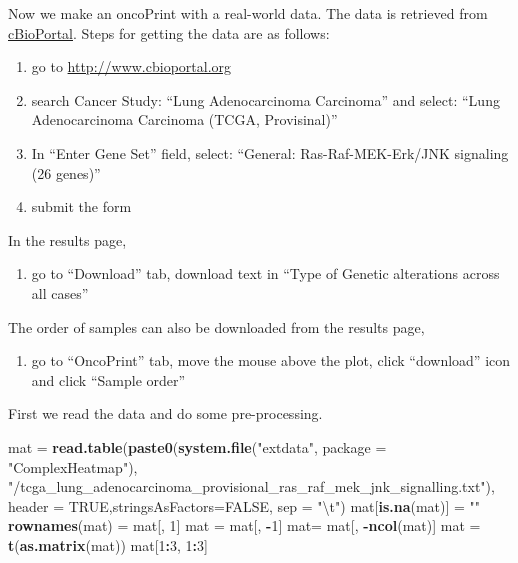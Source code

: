 \documentclass[]{book}
\newenvironment{Shaded}{\begin{snugshade}}{\end{snugshade}}
\newcommand{\KeywordTok}[1]{\textcolor[rgb]{0.13,0.29,0.53}{\textbf{#1}}}
\newcommand{\DataTypeTok}[1]{\textcolor[rgb]{0.13,0.29,0.53}{#1}}
\newcommand{\DecValTok}[1]{\textcolor[rgb]{0.00,0.00,0.81}{#1}}
\newcommand{\CharTok}[1]{\textcolor[rgb]{0.31,0.60,0.02}{#1}}
\newcommand{\StringTok}[1]{\textcolor[rgb]{0.31,0.60,0.02}{#1}}
\newcommand{\OtherTok}[1]{\textcolor[rgb]{0.56,0.35,0.01}{#1}}
\newcommand{\OperatorTok}[1]{\textcolor[rgb]{0.81,0.36,0.00}{\textbf{#1}}}
\newcommand{\NormalTok}[1]{#1}
\providecommand{\tightlist}{%
  \setlength{\itemsep}{0pt}\setlength{\parskip}{0pt}}
\theoremstyle{definition}
\theoremstyle{definition}
\theoremstyle{definition}
\theoremstyle{remark}
\begin{document}
Now we make an oncoPrint with a real-world data. The data is retrieved
from \href{http://www.cbioportal.org/}{cBioPortal}. Steps for getting
the data are as follows:

\begin{enumerate}
\def\labelenumi{\arabic{enumi}.}
\tightlist
\item
  go to \url{http://www.cbioportal.org}
\item
  search Cancer Study: ``Lung Adenocarcinoma Carcinoma'' and select:
  ``Lung Adenocarcinoma Carcinoma (TCGA, Provisinal)''
\item
  In ``Enter Gene Set'' field, select: ``General: Ras-Raf-MEK-Erk/JNK
  signaling (26 genes)''
\item
  submit the form
\end{enumerate}

In the results page,

\begin{enumerate}
\def\labelenumi{\arabic{enumi}.}
\setcounter{enumi}{4}
\tightlist
\item
  go to ``Download'' tab, download text in ``Type of Genetic alterations
  across all cases''
\end{enumerate}

The order of samples can also be downloaded from the results page,

\begin{enumerate}
\def\labelenumi{\arabic{enumi}.}
\setcounter{enumi}{5}
\tightlist
\item
  go to ``OncoPrint'' tab, move the mouse above the plot, click
  ``download'' icon and click ``Sample order''
\end{enumerate}

First we read the data and do some pre-processing.

\begin{Shaded}
\begin{Highlighting}[]
\NormalTok{mat =}\StringTok{ }\KeywordTok{read.table}\NormalTok{(}\KeywordTok{paste0}\NormalTok{(}\KeywordTok{system.file}\NormalTok{(}\StringTok{"extdata"}\NormalTok{, }\DataTypeTok{package =} \StringTok{"ComplexHeatmap"}\NormalTok{), }
    \StringTok{"/tcga_lung_adenocarcinoma_provisional_ras_raf_mek_jnk_signalling.txt"}\NormalTok{), }
    \DataTypeTok{header =} \OtherTok{TRUE}\NormalTok{,}\DataTypeTok{stringsAsFactors=}\OtherTok{FALSE}\NormalTok{, }\DataTypeTok{sep =} \StringTok{"}\CharTok{\textbackslash{}t}\StringTok{"}\NormalTok{)}
\NormalTok{mat[}\KeywordTok{is.na}\NormalTok{(mat)] =}\StringTok{ ""}
\KeywordTok{rownames}\NormalTok{(mat) =}\StringTok{ }\NormalTok{mat[, }\DecValTok{1}\NormalTok{]}
\NormalTok{mat =}\StringTok{ }\NormalTok{mat[, }\OperatorTok{-}\DecValTok{1}\NormalTok{]}
\NormalTok{mat=}\StringTok{  }\NormalTok{mat[, }\OperatorTok{-}\KeywordTok{ncol}\NormalTok{(mat)]}
\NormalTok{mat =}\StringTok{ }\KeywordTok{t}\NormalTok{(}\KeywordTok{as.matrix}\NormalTok{(mat))}
\NormalTok{mat[}\DecValTok{1}\OperatorTok{:}\DecValTok{3}\NormalTok{, }\DecValTok{1}\OperatorTok{:}\DecValTok{3}\NormalTok{]}
\end{Highlighting}
\end{Shaded}
\end{document}
